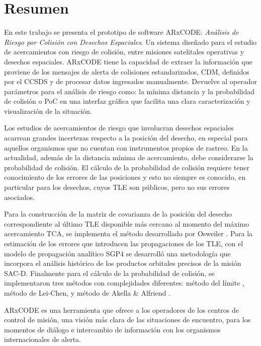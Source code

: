 \chapter*{Resumen}
\label{chap:resumen}
En este trabajo se presenta el prototipo de software ARxCODE: {\it{An\'alisis de Riesgo por Colisi\'on con Desechos Espaciales}}. Un sistema dise\~nado para el estudio de acercamientos con riesgo de colisi\'on, entre misiones satelitales operativas y desechos espaciales. 
ARxCODE tiene la capacidad de extraer la informaci\'on que proviene de los mensajes de alerta de colisiones estandarizados, \ac{CDM}, definidos por el \ac{CCSDS} y de procesar datos ingresados manualmente.
Devuelve al operador par\'ametros para el an\'alisis de riesgo como: la m\'inima distancia y la probabilidad de colisi\'on  o \ac{PoC} en una interfaz gr\'afica que facilita una clara caracterizaci\'on y visualizaci\'on de la situaci\'on.

Los estudios de acercamientos de riesgo que involucran desechos espaciales acarrean grandes incertezas respecto a la posici\'on del desecho, en especial para aquellos organismos que no cuentan con instrumentos propios de rastreo.
En la actualidad, adem\'as de la distancia m\'inima de acercamiento, debe considerarse la probabilidad de colisi\'on. El c\'alculo de la probabilidad de colisi\'on requiere tener conocimiento de los errores de las posiciones y esto no siempre es conocido, en particular para los desechos, cuyos \ac{TLE} son p\'ublicos, pero no sus errores asociados. 

Para la construcci\'on de la matriz de covarianza de la posici\'on del desecho correspondiente al \'ultimo TLE disponible m\'as cercano al momento del m\'aximo acercamiento \ac{TCA}, se implementa el m\'etodo desarrollado por Osweiler \citep{osweiler}.
Para la estimaci\'on de los errores que introducen las propagaciones de los TLE, con el modelo de propagaci\'on anal\'itico \ac{SGP4} se desarroll\'o una metodolog\'ia que incorpora el análisis hist\'orico de los productos orbitales precisos de la misi\'on SAC-D.
Finalmente para el c\'alculo de la probabilidad de colisi\'on, se implementaron tres m\'etodos con complejidades diferentes: m\'etodo del l\'imite \citep{alfano2008method}, m\'etodo de Lei-Chen, \citep{leichen} y m\'etodo de Akella \& Alfriend \citep{akellaAlfriend}.

ARxCODE es una herramienta que ofrece a los operadores de los centros de control de misi\'on, una visi\'on m\'as clara de las situaciones de encuentro, para los momentos de di\'alogo e intercambio de informaci\'on con los organismos internacionales de alerta.

